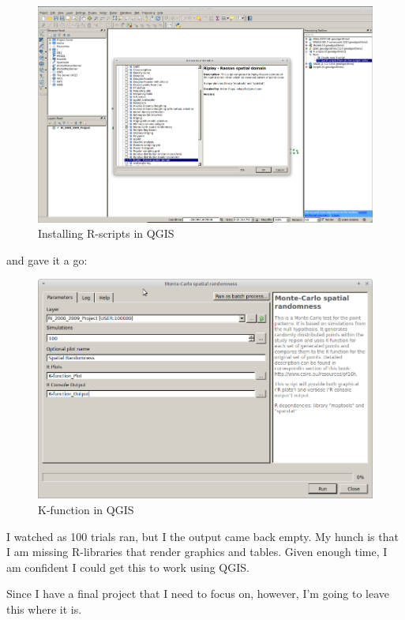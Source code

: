 \documentclass[11pt]{article}
\makeatletter
\def\maxwidth{\ifdim\Gin@nat@width>\linewidth\linewidth
    \else\Gin@nat@width\fi}
\let\Oldincludegraphics\includegraphics
\renewcommand{\includegraphics}[1]{\Oldincludegraphics[width=.8\maxwidth]{#1}}
\makeatother
\begin{document}
\begin{figure}
\centering
\includegraphics{images/installRscripts.png}
\caption{Installing R-scripts in QGIS}
\end{figure}

and gave it a go:

\begin{figure}
\centering
\includegraphics{images/Monte-Carlo.png}
\caption{K-function in QGIS}
\end{figure}

I watched as 100 trials ran, but I the output came back empty. My hunch
is that I am missing R-libraries that render graphics and tables. Given
enough time, I am confident I could get this to work using QGIS.

Since I have a final project that I need to focus on, however, I'm going
to leave this where it is.

\vskip 0.2in
\end{document}

